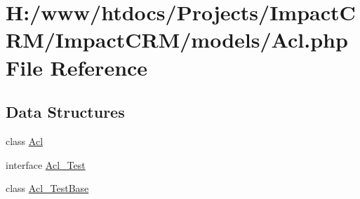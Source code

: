 \hypertarget{Acl_8php}{
\section{H:/www/htdocs/Projects/ImpactCRM/ImpactCRM/models/Acl.php File Reference}
\label{Acl_8php}
}
\subsection*{Data Structures}
\begin{DoxyCompactItemize}
\item 
class \hyperlink{classAcl}{Acl}
\item 
interface \hyperlink{interfaceAcl__Test}{Acl\_\-Test}
\item 
class \hyperlink{classAcl__TestBase}{Acl\_\-TestBase}
\end{DoxyCompactItemize}
